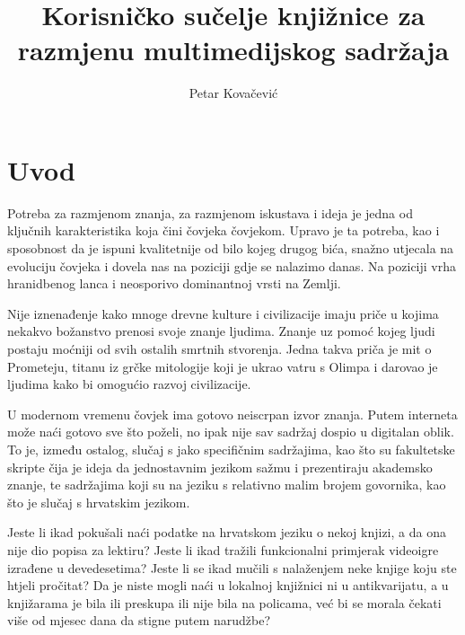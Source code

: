 \documentclass[times, utf8, zavrsni, numeric]{fer}
\newcommand{\razmakp}{\vspace{18pt}}
\begin{document}

\title{Korisničko sučelje knjižnice za razmjenu multimedijskog sadržaja}

\author{Petar Kovačević}

\maketitle



\zahvala{}


\tableofcontents


\chapter{Uvod}

Potreba za razmjenom znanja, za razmjenom iskustava i ideja je jedna od ključnih karakteristika koja čini čovjeka čovjekom.
Upravo je ta potreba, kao i sposobnost da je ispuni kvalitetnije od bilo kojeg drugog bića, snažno utjecala na evoluciju čovjeka i dovela nas na poziciji gdje se nalazimo danas.
Na poziciji vrha hranidbenog lanca i neosporivo dominantnoj vrsti na Zemlji.

Nije iznenađenje kako mnoge drevne kulture i civilizacije imaju priče u kojima nekakvo božanstvo prenosi svoje znanje ljudima.
Znanje uz pomoć kojeg ljudi postaju moćniji od svih ostalih smrtnih stvorenja.
Jedna takva priča je mit o Prometeju, titanu iz grčke mitologije koji je ukrao vatru s Olimpa i darovao je ljudima kako bi omogućio razvoj civilizacije.

\razmakp

U modernom vremenu čovjek ima gotovo neiscrpan izvor znanja.
Putem interneta može naći gotovo sve što poželi, no ipak nije sav sadržaj dospio u digitalan oblik.
To je, između ostalog, slučaj s jako specifičnim sadržajima, kao što su fakultetske skripte čija je ideja da jednostavnim jezikom sažmu i prezentiraju akademsko znanje, te sadržajima koji su na jeziku s relativno malim brojem govornika, kao što je slučaj s hrvatskim jezikom.

Jeste li ikad pokušali naći podatke na hrvatskom jeziku o nekoj knjizi, a da ona nije dio popisa za lektiru?
Jeste li ikad tražili funkcionalni primjerak videoigre izrađene u devedesetima?
Jeste li se ikad mučili s nalaženjem neke knjige koju ste htjeli pročitat?
Da je niste mogli naći u lokalnoj knjižnici ni u antikvarijatu, a u knjižarama je bila ili preskupa ili nije bila na policama, već bi se morala čekati više od mjesec dana da stigne putem narudžbe?
\end{document}
